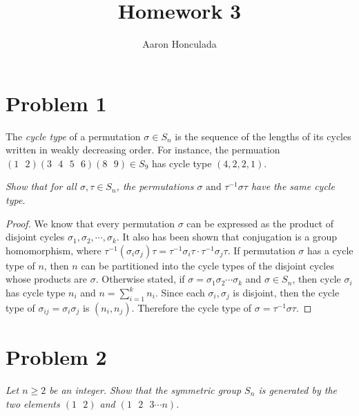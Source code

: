 \documentclass{article}
\title{Homework 3}
\author{Aaron Honculada}
\date{\monthname[\month] \the\year}
\theoremstyle{plain} %
\theoremstyle{definition} %
\begin{document}
\maketitle

\section*{Problem 1}
\noindent The \textit{cycle type} of a permutation $\sigma \in S_n$ is the sequence of the lengths of
its cycles written
in weakly decreasing order. For instance, the permuation $(1\text{ }2)(3\text{ }4\text{ }5\text{ }6)(8\text{ }9) \in S_9$ has
cycle type $(4,2,2,1)$.


\noindent\textit{Show that for all $\sigma, \tau \in S_n$, the permutations $\sigma\text{ and }\tau^{-1}\sigma\tau$ have
the same cycle type.}

\begin{proof}
    We know that every permutation $\sigma$ can be expressed as the product of disjoint cycles $\sigma_1, \sigma_2, \cdots, \sigma_k$.
    It also has been shown that conjugation is a group homomorphism, where $\tau^{-1}(\sigma_i\sigma_j)\tau = \tau^{-1}\sigma_i\tau \cdot
    \tau^{-1}\sigma_j\tau$. If permutation $\sigma$ has a cycle type of $n$, then $n$ can be partitioned into the cycle types of the disjoint
    cycles whose products are $\sigma$. Otherwise stated, if $\sigma=\sigma_1\sigma_2\cdots\sigma_k$ and $\sigma \in S_n$, then cycle
    $\sigma_i$ has cycle type $n_i$ and $n = \sum_{i=1}^{k}n_i$. Since each $\sigma_i,\sigma_j$ is disjoint,
    then the cycle type of $\sigma_{ij} = \sigma_i\sigma_j$ is $(n_i, n_j)$. Therefore the cycle type of $\sigma = 
    \tau^{-1}\sigma\tau$.

    
\end{proof}



\section*{Problem 2}
\noindent\textit{Let $n \geq 2$ be an integer. Show that the symmetric group $S_n$ is generated by the two
elements $(1 \text{ }2)$ and $(1\text{ }2\text{ }3\cdots n)$.}
\end{document}
